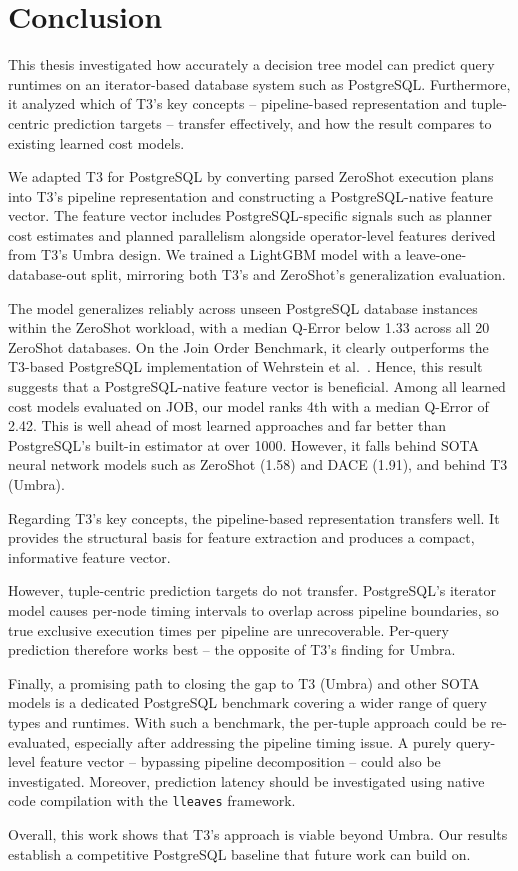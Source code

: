 
\chapter{Conclusion}\label{chapter:conclusion}

This thesis investigated how accurately a decision tree model can predict query runtimes on an iterator-based database system such as PostgreSQL.
Furthermore, it analyzed which of T3's key concepts -- pipeline-based representation and tuple-centric prediction targets -- transfer effectively, and how the result compares to existing learned cost models.

We adapted T3 for PostgreSQL by converting parsed ZeroShot execution plans into T3's pipeline representation and constructing a PostgreSQL-native feature vector.
The feature vector includes PostgreSQL-specific signals such as planner cost estimates and planned parallelism alongside operator-level features derived from T3's Umbra design.
We trained a LightGBM model with a leave-one-database-out split, mirroring both T3's and ZeroShot's generalization evaluation.

The model generalizes reliably across unseen PostgreSQL database instances within the ZeroShot workload, with a median Q-Error below 1.33 across all 20 ZeroShot databases.
On the Join Order Benchmark, it clearly outperforms the T3-based PostgreSQL implementation of Wehrstein et al.~\parencite{jobcomplex}.
Hence, this result suggests that a PostgreSQL-native feature vector is beneficial.
Among all learned cost models evaluated on JOB, our model ranks 4th with a median Q-Error of 2.42.
This is well ahead of most learned approaches and far better than PostgreSQL's built-in estimator at over 1000.
However, it falls behind SOTA neural network models such as ZeroShot (1.58) and DACE (1.91), and behind T3 (Umbra).

Regarding T3's key concepts, the pipeline-based representation transfers well.
It provides the structural basis for feature extraction and produces a compact, informative feature vector.

However, tuple-centric prediction targets do not transfer.
PostgreSQL's iterator model causes per-node timing intervals to overlap across pipeline boundaries, so true exclusive execution times per pipeline are unrecoverable.
Per-query prediction therefore works best -- the opposite of T3's finding for Umbra.

Finally, a promising path to closing the gap to T3 (Umbra) and other SOTA models is a dedicated PostgreSQL benchmark covering a wider range of query types and runtimes.
With such a benchmark, the per-tuple approach could be re-evaluated, especially after addressing the pipeline timing issue.
A purely query-level feature vector -- bypassing pipeline decomposition -- could also be investigated.
Moreover, prediction latency should be investigated using native code compilation with the \texttt{lleaves} framework.

Overall, this work shows that T3's approach is viable beyond Umbra.
Our results establish a competitive PostgreSQL baseline that future work can build on.
